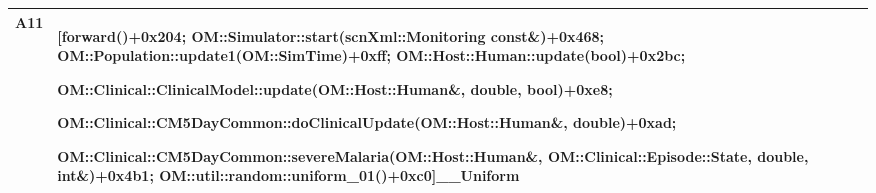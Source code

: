 \documentclass{article}
\begin{document}
\begin{table}[h!]
\begin{tabularx}{\textwidth}{@{}lX@{}}













A11 & [forward()+0x204; OM::Simulator::start(scnXml::Monitoring const\&)+0x468;
OM::Population::update1(OM::SimTime)+0xff; OM::Host::Human::update(bool)+0x2bc;

OM::Clinical::ClinicalModel::update(OM::Host::Human\&, double, bool)+0xe8;

OM::Clinical::CM5DayCommon::doClinicalUpdate(OM::Host::Human\&, double)+0xad;

OM::Clinical::CM5DayCommon::severeMalaria(OM::Host::Human\&, OM::Clinical::Episode::State, double, int\&)+0x4b1;
OM::util::random::uniform\_01()+0xc0]\_\_Uniform\\
\bottomrule
  \end{tabularx}
  \end{table}
\end{document}
